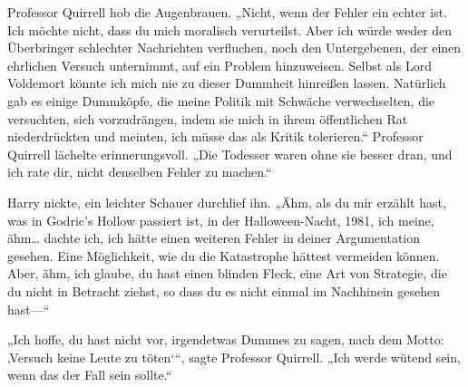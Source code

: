 Professor Quirrell hob die Augenbrauen.
„Nicht, wenn der Fehler ein echter ist. Ich möchte nicht, dass du mich moralisch verurteilst. Aber ich würde weder den Überbringer schlechter Nachrichten verfluchen, noch den Untergebenen, der einen ehrlichen Versuch unternimmt, auf ein Problem hinzuweisen. Selbst als Lord Voldemort könnte ich mich nie zu dieser Dummheit hinreißen lassen. Natürlich gab es einige Dummköpfe, die meine Politik mit Schwäche verwechselten, die versuchten, sich vorzudrängen, indem sie mich in ihrem öffentlichen Rat niederdrückten und meinten, ich müsse das als Kritik tolerieren.“
Professor Quirrell lächelte erinnerungsvoll.
„Die Todesser waren ohne sie besser dran, und ich rate dir, nicht denselben Fehler zu machen.“

Harry nickte, ein leichter Schauer durchlief ihn.
„Ähm, als du mir erzählt hast, was in Godric’s Hollow passiert ist, in der Halloween-Nacht, 1981, ich meine, ähm… dachte ich, ich hätte einen weiteren Fehler in deiner Argumentation gesehen. Eine Möglichkeit, wie du die Katastrophe hättest vermeiden können. Aber, ähm, ich glaube, du hast einen blinden Fleck, eine Art von Strategie, die du nicht in Betracht ziehst, so dass du es nicht einmal im Nachhinein gesehen hast—“

„Ich hoffe, du hast nicht vor, irgendetwas Dummes zu sagen, nach dem Motto: ‚Versuch keine Leute zu töten‘“, sagte Professor Quirrell. „Ich werde wütend sein, wenn das der Fall sein sollte.“

